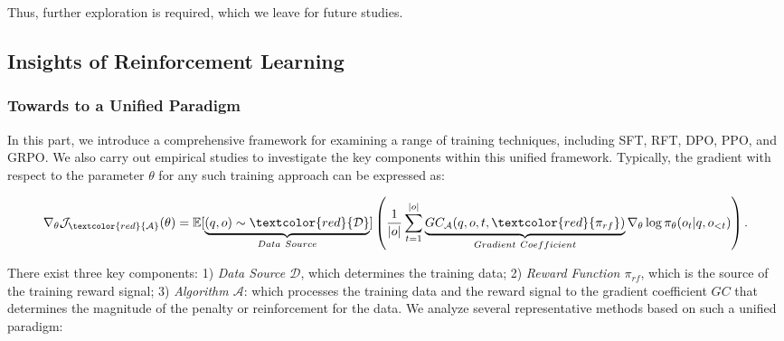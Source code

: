\begin{itemize}[topsep=0pt]
\begin{itemize}[topsep=0pt]
Thus, further exploration is required, which we leave for future studies.

\subsection{Insights of Reinforcement Learning}
\subsubsection{Towards to a Unified Paradigm} In this part, we introduce a comprehensive framework for examining a range of training techniques, including SFT, RFT, DPO, PPO, and GRPO. We also carry out empirical studies to investigate the key components within this unified framework. Typically, the gradient with respect to the parameter $\theta$ for any such training approach can be expressed as:

\begin{equation}
    \nabla_{\theta}\mathcal{J}_{\textcolor{red}{\mathcal{A}}}(\theta) = \mathbb{E}[\underbrace{(q,o) \sim \textcolor{red}{\mathcal{D}}}_{Data \ Source}]\left( \frac{1}{|o|} \sum_{t=1}^{|o|}  \underbrace{GC_{{\mathcal{A}}}(q, o, t, \textcolor{red}{\pi_{{rf}}})}_{Gradient \ Coefficient}  \nabla_{\theta}\log \pi_{\theta}(o_t | q, o_{<t})\right).
\label{eq:objective}
\end{equation}

There exist three key components: 1) \textit{Data Source $\mathcal{D}$}, which determines the training data; 2) \textit{Reward Function $\pi_{{rf}}$}, which is the source of the training reward signal; 3) \textit{Algorithm $\mathcal{A}$}: which processes the training data and the reward signal to the gradient coefficient $GC$ that determines the magnitude of the penalty or reinforcement for the data. We analyze several representative methods based on such a unified paradigm:


\end{itemize}
\end{itemize}
